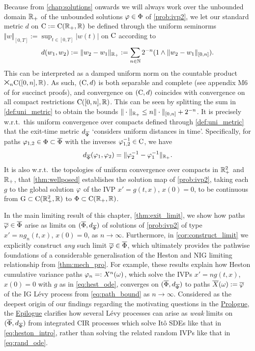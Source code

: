 Because from \autoref{chap:solutions} onwards we will always work over the unbounded domain $\mathbb{R}_+$ of the unbounded solutions $\varphi\in\Phi$ of \autoref{prob:ivp2}, we let our standard metric $d$ on $\mathrm{C}:=\mathrm{C}(\mathbb{R}_+,\mathbb{R})$ be defined through the uniform seminorms $\Vert w \Vert_{[0,T]}:=\sup_{t\in[0,T]}|w(t)|$ on $\mathrm{C}$ according to
\begin{equation}\label{def:uni_metric}
    d(w_1,w_2) := \Vert w_2 - w_1 \Vert_{\mathbb{R}_+} := \sum_{n\in\mathbb{N}} 2^{-n}(1\wedge \Vert w_2-w_1 \Vert_{[0,n]}).
\end{equation}
This can be interpreted as a damped uniform norm on the countable product $\!\text{\Large$\times$}_{\!n}\mathrm{C}([0,n],\mathbb{R})$. As such, $(\mathrm{C},d)$ is both separable and complete (see appendix M6 of \cite{billingsley_1999} for succinct proofs), and convergence on $(\mathrm{C},d)$ coincides with convergence on all compact restrictions $\mathrm{C}([0,n],\mathbb{R})$. This can be seen by splitting the sum in \autoref{def:uni_metric} to obtain the bounds $\Vert\cdot\Vert_{\mathbb{R}_+}\le n \Vert \cdot \Vert_{[0,n]} + 2^{-n}$. It is precisely w.r.t.~this uniform convergence over compacts defined through \autoref{def:uni_metric} that the exit-time metric $d_{\overline{\Phi}}$ `considers uniform distances in time'. Specifically, for paths $\varphi_{1,2}\in\Phi\subset\overline{\Phi}$ with the inverses $\varphi_{1,2}^{-1}\in\mathrm{C}$, we have
\begin{equation}
    d_{\overline{\Phi}}(\varphi_1,\varphi_2) = \Vert \varphi^{-1}_2 - \varphi^{-1}_1 \Vert_{\mathbb{R}_+}.
\end{equation}
It is also w.r.t.~the topologies of uniform convergence over compacts in $\mathbb{R}^2_+$ and $\mathbb{R}_+$, that \autoref{thm:wellposed} establishes the solution map of \autoref{prob:ivp2}, taking each $g$ to the global solution $\varphi$ of the IVP $x'=g(t,x)$, $x(0)=0$, to be continuous from $\mathrm{G}\subset\mathrm{C}(\mathbb{R}_+^2,\mathbb{R})$ to $\Phi\subset\mathrm{C}(\mathbb{R}_+,\mathbb{R})$.

In the main limiting result of this chapter, \autoref{thm:exit_limit}, we show how paths $\overline{\varphi}\in\overline{\Phi}$ arise as limits on $(\overline{\Phi},d_{\overline{\Phi}})$ of solutions of \autoref{prob:ivp2} of type $x'=ng_n(t,x)$, $x(0)=0$, as $n\to\infty$. Furthermore, in \autoref{cor:construct_limit} we explicitly construct \emph{any} such limit $\overline{\varphi}\in\overline{\Phi}$, which ultimately provides the pathwise foundations of a considerable generalisation of the Heston and NIG limiting relationship from \autoref{thm:mech_pro}. For example, these results explain how Heston cumulative variance paths $\varphi_n =: X^n(\omega)$, which solve the IVPs $x'=ng(t,x)$, $x(0)=0$ with $g$ as in \autoref{eq:hest_ode}, converges on $(\overline{\Phi},d_{\overline{\Phi}})$ to paths ${\overline{X}}(\omega) := \overline{\varphi}$ of the IG L\'evy process from \autoref{eq:path_bound} as $n\to\infty$. Considered as the deepest origin of our findings regarding the motivating questions in the \hyperlink{prologue}{Prologue}, the \hyperlink{epilogue}{Epilogue} clarifies how several L\'evy processes can arise as \emph{weak} limits on $(\overline{\Phi},d_{\overline{\Phi}})$ from integrated CIR processes which solve It\^o SDEs like that in \autoref{eq:heston_intro}, rather than solving the related random IVPs like that in \autoref{eq:rand_ode}.

